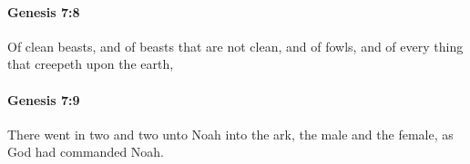 		\paragraph{Genesis 7:8} %
			\label{GENESIS-7-8}

			Of clean beasts, and of beasts that are not clean, and of fowls, and of every thing that creepeth upon the earth,


		\paragraph{Genesis 7:9} %
			\label{GENESIS-7-9}

			There went in two and two unto Noah into the ark, the male and the female, as God had commanded Noah.


